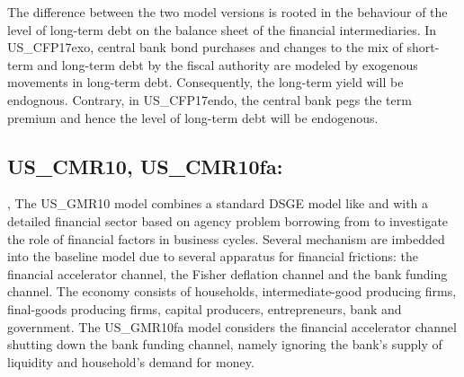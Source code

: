 \documentclass[11pt,a4paper]{article}
\begin{document}
	The difference between the two model versions is rooted in the behaviour of the level of long-term debt on the balance sheet of the financial intermediaries. In US\_CFP17exo, central bank bond purchases and changes to the mix of short-term and long-term debt by the fiscal authority are modeled by exogenous movements in long-term debt. Consequently, the long-term yield will be endognous. Contrary, in US\_CFP17endo, the central bank pegs the term premium and hence the level of long-term debt will be endogenous. 
	
	
	
	\subsection{US\_CMR10, US\_CMR10fa: \cite{Christianoetal2010}}
	\label{USCMR10}, \label{USGMR10fa}
	The US\_GMR10 model combines a standard DSGE model like \cite{SmetsWouters2003} and \cite{SmetsWouters2007} with a detailed financial sector based on agency problem borrowing from \cite{BernankeGertlerGilchrist1999} to investigate the role of financial factors in business cycles. Several mechanism are imbedded into the baseline model due to several apparatus for financial frictions: the financial accelerator channel, the Fisher deflation channel and the bank funding channel. The economy consists of households, intermediate-good producing firms, final-goods producing firms, capital producers, entrepreneurs, bank and government. The US\_GMR10fa model considers the financial accelerator channel shutting down the bank funding channel, namely ignoring the bank's supply of liquidity and household's demand for money. \\
	
\end{document}

